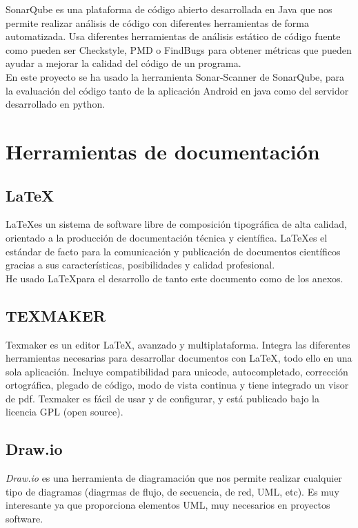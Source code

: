 SonarQube es una plataforma de código abierto desarrollada en Java que nos permite realizar análisis de código con diferentes herramientas de forma automatizada. Usa diferentes herramientas de análisis estático de código fuente como pueden ser Checkstyle, PMD o FindBugs para obtener métricas que pueden ayudar a mejorar la calidad del código de un programa.\\
En este proyecto se ha usado la herramienta Sonar-Scanner de SonarQube, para la evaluación del código tanto de la aplicación Android en java como del servidor desarrollado en python.



\section{Herramientas de documentación}

\subsection{\LaTeX}

\LaTeX es un sistema de software libre de composición tipográfica de alta calidad, orientado a la producción de documentación técnica y científica. \LaTeX es el estándar de facto para la comunicación y publicación de documentos científicos gracias a sus características, posibilidades y calidad profesional.\\
He usado \LaTeX para el desarrollo de tanto este documento como de los anexos.

\subsection{TEXMAKER}

Texmaker es un editor \LaTeX, avanzado y multiplataforma. 
Integra las diferentes herramientas necesarias para desarrollar documentos con \LaTeX, todo ello en una sola aplicación.
Incluye compatibilidad para unicode, autocompletado, corrección ortográfica, plegado de código, modo de vista continua y tiene integrado un visor de pdf.
Texmaker es fácil de usar y de configurar, y está publicado bajo la licencia GPL (open source).

\subsection{Draw.io}

\textit{Draw.io} es una herramienta de diagramación que nos permite realizar cualquier tipo de diagramas (diagrmas de flujo, de secuencia, de red, UML, etc). Es muy interesante ya que proporciona elementos UML, muy necesarios en proyectos software.



